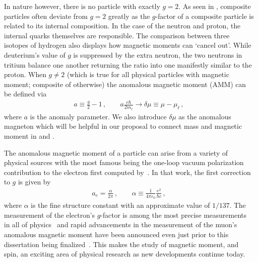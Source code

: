 In nature however, there is no particle with exactly $g=2$. As seen in , composite particles often deviate from $g=2$ greatly as the $g$-factor of a composite particle is related to its internal composition. In the case of the neutron and proton, the internal quarks themselves are responsible. The comparison between three isotopes of hydrogen also displays how magnetic moments can \lq cancel out\rq. While deuterium's value of $g$ is suppressed by the extra neutron, the two neutrons in tritium balance one another returning the ratio into one manifestly similar to the proton. When $g\neq2$ (which is true for all physical particles with magnetic moment; composite of otherwise) the anomalous magnetic moment (AMM) can be defined via 
\begin{gather}
    \label{amm:1}
    a\equiv\frac{g}{2}-1\,,\qquad
    a\frac{e\hbar}{2m_{\ell}}\rightarrow\delta\mu\equiv\mu-\mu_{\ell}\,,
\end{gather}
where $a$ is the anomaly parameter. We also introduce $\delta\mu$ as the anomalous magneton which will be helpful in our proposal to connect mass and magnetic moment in  and .

The anomalous magnetic moment of a particle can arise from a variety of physical sources with the most famous being the one-loop vacuum polarization contribution to the electron first computed by~\cite{Schwinger:1951nm}. In that work, the first correction to $g$ is given by
\begin{gather}
    a_{e} = \frac{\alpha}{2\pi}\,,\qquad
    \alpha\equiv\frac{1}{4\pi\varepsilon_{0}}\frac{e^{2}}{\hbar c}\,,
\end{gather}
where $\alpha$ is the fine structure constant with an approximate value of $1/137$. The measurement of the electron's $g$-factor is among the most precise measurements in all of physics~\citep{Tiesinga:2021myr} and rapid advancements in the measurement of the muon's anomalous magnetic moment have been announced even just prior to this dissertation being finalized~\citep{Muong-2:2023cdq}. This makes the study of magnetic moment, and spin, an exciting area of physical research as new developments continue today.

